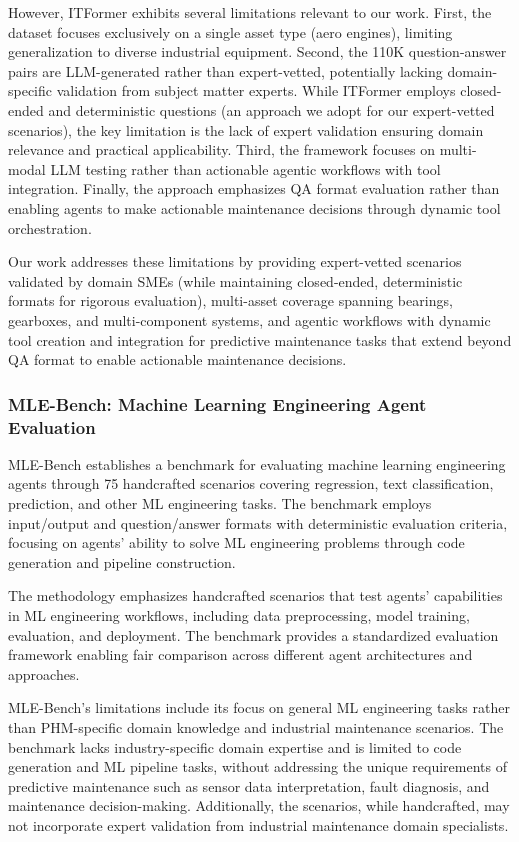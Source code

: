 \documentclass[conference]{IEEEtran}
\begin{document}
However, ITFormer exhibits several limitations relevant to our work. First, the dataset focuses exclusively on a single asset type (aero engines), limiting generalization to diverse industrial equipment. Second, the 110K question-answer pairs are LLM-generated rather than expert-vetted, potentially lacking domain-specific validation from subject matter experts. While ITFormer employs closed-ended and deterministic questions (an approach we adopt for our expert-vetted scenarios), the key limitation is the lack of expert validation ensuring domain relevance and practical applicability. Third, the framework focuses on multi-modal LLM testing rather than actionable agentic workflows with tool integration. Finally, the approach emphasizes QA format evaluation rather than enabling agents to make actionable maintenance decisions through dynamic tool orchestration.

Our work addresses these limitations by providing expert-vetted scenarios validated by domain SMEs (while maintaining closed-ended, deterministic formats for rigorous evaluation), multi-asset coverage spanning bearings, gearboxes, and multi-component systems, and agentic workflows with dynamic tool creation and integration for predictive maintenance tasks that extend beyond QA format to enable actionable maintenance decisions.

\subsubsection{MLE-Bench: Machine Learning Engineering Agent Evaluation}

MLE-Bench \cite{patil2024mlebench} establishes a benchmark for evaluating machine learning engineering agents through 75 handcrafted scenarios covering regression, text classification, prediction, and other ML engineering tasks. The benchmark employs input/output and question/answer formats with deterministic evaluation criteria, focusing on agents' ability to solve ML engineering problems through code generation and pipeline construction.

The methodology emphasizes handcrafted scenarios that test agents' capabilities in ML engineering workflows, including data preprocessing, model training, evaluation, and deployment. The benchmark provides a standardized evaluation framework enabling fair comparison across different agent architectures and approaches.

MLE-Bench's limitations include its focus on general ML engineering tasks rather than PHM-specific domain knowledge and industrial maintenance scenarios. The benchmark lacks industry-specific domain expertise and is limited to code generation and ML pipeline tasks, without addressing the unique requirements of predictive maintenance such as sensor data interpretation, fault diagnosis, and maintenance decision-making. Additionally, the scenarios, while handcrafted, may not incorporate expert validation from industrial maintenance domain specialists.
\end{document}
